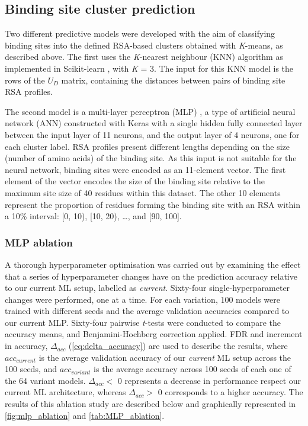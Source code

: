 \subsection{Binding site cluster prediction}

Two different predictive models were developed with the aim of classifying binding sites into the defined RSA-based clusters obtained with \textit{K}-means, as described above. The first  uses the \textit{K}-nearest neighbour (KNN) algorithm as implemented in Scikit-learn \cite{PEDREGOSA_2011_SKLEARN}, with \textit{K} = 3. The input for this KNN model is the rows of the $U_{D}$ matrix, containing the distances between pairs of binding site RSA profiles.

The second model is a multi-layer perceptron (MLP) \cite{CYBENKO_1989_MLP}, a type of artificial neural network (ANN) constructed with Keras \cite{CHOLLET_2015_KERAS} with a single hidden fully connected layer between the input layer of 11 neurons, and the output layer of 4 neurons, one for each cluster label. RSA profiles present different lengths depending on the size (number of amino acids) of the binding site. As this input is not suitable for the neural network, binding sites were encoded as an 11-element vector. The first element of the vector encodes the size of the binding site relative to the maximum site size of 40 residues within this dataset. The other 10 elements represent the proportion of residues forming the binding site with an RSA within a 10\% interval: [0, 10), [10, 20), …, and [90, 100].

\subsubsection{MLP ablation}

A thorough hyperparameter optimisation was carried out by examining the effect that a series of hyperparameter changes have on the prediction accuracy relative to our current ML setup, labelled as \textit{current}. Sixty-four single-hyperparameter changes were performed, one at a time. For each variation, 100 models were trained with different seeds and the average validation accuracies compared to our current MLP. Sixty-four pairwise \textit{t}-tests were conducted to compare the accuracy means, and Benjamini-Hochberg correction \cite{BENJAMINI_1995_FDR} applied. FDR and increment in accuracy, $\Delta_{acc}$ (\autoref{eq:delta_accuracy}) are used to describe the results, where $acc_{current}$ is the average validation accuracy of our \textit{current} ML setup across the 100 seeds, and $acc_{variant}$ is the average accuracy across 100 seeds of each one of the 64 variant models. $\Delta_{acc} <$ 0 represents a decrease in performance respect our current ML architecture, whereas $\Delta_{acc} >$ 0 corresponds to a higher accuracy. The results of this ablation study are described below and graphically represented in \autoref{fig:mlp_ablation} and \autoref{tab:MLP_ablation}.

